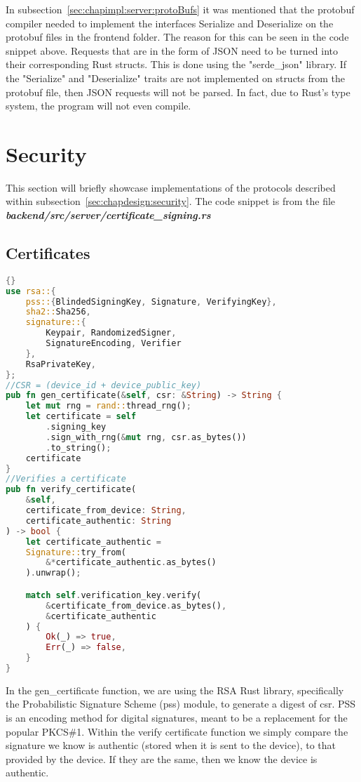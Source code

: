 In subsection~\ref{sec:chapimpl:server:protoBufs} it was mentioned that the protobuf compiler needed to implement the interfaces Serialize and Deserialize on the protobuf files in the frontend folder. The reason for this can be seen in the code snippet above. Requests that are in the form of JSON need to be turned into their corresponding Rust structs. This is done using the "serde\_json" library. If the "Serialize" and "Deserialize" traits are not implemented on structs from the protobuf file, then JSON requests will not be parsed. In fact, due to Rust's type system, the program will not even compile.

\section{Security} \label{sec:chapimpl:security}
This section will briefly showcase implementations of the protocols described within subsection~\ref{sec:chapdesign:security}. The code snippet is from the file \textit{\textbf{backend/src/server/certificate\_signing.rs}} 

\subsection{Certificates} \label{sec:chapimpl:security:certificates}
\begin{lstlisting}[language=Rust, style=boxed, showstringspaces=false]{}
use rsa::{
    pss::{BlindedSigningKey, Signature, VerifyingKey},
    sha2::Sha256,
    signature::{
        Keypair, RandomizedSigner, 
        SignatureEncoding, Verifier
    },
    RsaPrivateKey,
};
//CSR = (device_id + device_public_key)
pub fn gen_certificate(&self, csr: &String) -> String {
    let mut rng = rand::thread_rng();
    let certificate = self
        .signing_key
        .sign_with_rng(&mut rng, csr.as_bytes())
        .to_string();
    certificate
}
//Verifies a certificate 
pub fn verify_certificate(
    &self,
    certificate_from_device: String,
    certificate_authentic: String
) -> bool {
    let certificate_authentic = 
    Signature::try_from(
        &*certificate_authentic.as_bytes()
    ).unwrap();

    match self.verification_key.verify(
        &certificate_from_device.as_bytes(),
        &certificate_authentic
    ) {
        Ok(_) => true,
        Err(_) => false,
    }
}
\end{lstlisting}
In the gen\_certificate function, we are using the RSA Rust library, specifically the Probabilistic Signature Scheme (pss) module, to generate a digest of csr. PSS is an encoding method for digital signatures, meant to be a replacement for the popular PKCS\#1. Within the verify certificate function we simply compare the signature we know is authentic (stored when it is sent to the device), to that provided by the device. If they are the same, then we know the device is authentic. 

